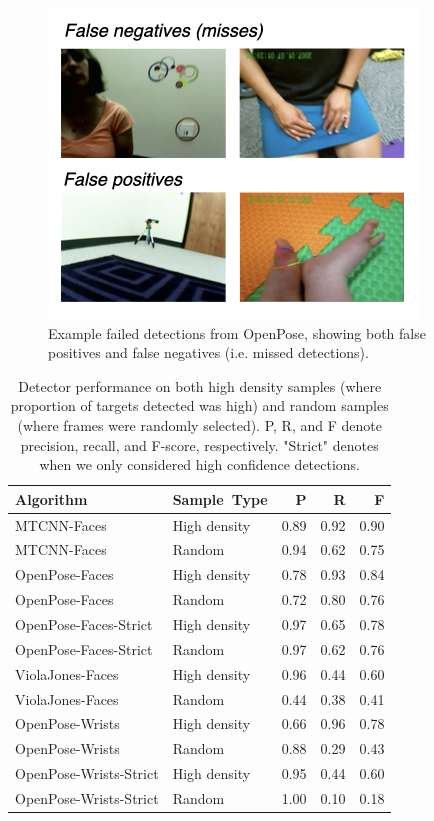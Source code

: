 \documentclass[english,man]{apa6}
\begin{document}
\begin{figure}[H]
\includegraphics[width=0.5\linewidth]{images/example_failures} \caption{Example failed detections from OpenPose, showing both false positives and false negatives (i.e. missed detections).}\label{fig:failures}
\end{figure}

\begin{table}[ht]
\centering
\begin{tabular}{llrrr}
  \hline
Algorithm & Sample\ Type & P & R & F \\ 
  \hline
MTCNN-Faces & High density & 0.89 & 0.92 & 0.90 \\ 
  MTCNN-Faces & Random & 0.94 & 0.62 & 0.75 \\ 
  OpenPose-Faces & High density & 0.78 & 0.93 & 0.84 \\ 
  OpenPose-Faces & Random & 0.72 & 0.80 & 0.76 \\ 
  OpenPose-Faces-Strict & High density & 0.97 & 0.65 & 0.78 \\ 
  OpenPose-Faces-Strict & Random & 0.97 & 0.62 & 0.76 \\ 
  ViolaJones-Faces & High density & 0.96 & 0.44 & 0.60 \\ 
  ViolaJones-Faces & Random & 0.44 & 0.38 & 0.41 \\ 
  \hline
  \hline
  OpenPose-Wrists & High density & 0.66 & 0.96 & 0.78 \\ 
  OpenPose-Wrists & Random & 0.88 & 0.29 & 0.43 \\ 
  OpenPose-Wrists-Strict & High density & 0.95 & 0.44 & 0.60 \\ 
  OpenPose-Wrists-Strict & Random & 1.00 & 0.10 & 0.18 \\
   \hline
\end{tabular}
\caption{Detector performance on both high density samples (where proportion of targets detected was high) and random samples (where frames were randomly selected). P, R, and F denote precision, recall, and F-score, respectively. "Strict" denotes when we only considered high confidence detections.} 
\vspace{-1em}
\end{table}
\end{document}
